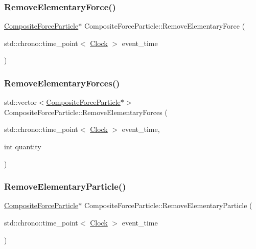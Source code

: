 \subsubsection{\texorpdfstring{Remove\+Elementary\+Force()}{RemoveElementaryForce()}}
{\footnotesize\ttfamily \mbox{\hyperlink{class_composite_force_particle}{Composite\+Force\+Particle}}$\ast$ Composite\+Force\+Particle\+::\+Remove\+Elementary\+Force (\begin{DoxyParamCaption}\item[{std\+::chrono\+::time\+\_\+point$<$ \mbox{\hyperlink{universe_8h_a0ef8d951d1ca5ab3cfaf7ab4c7a6fd80}{Clock}} $>$}]{event\+\_\+time }\end{DoxyParamCaption})}

\mbox{\label{class_composite_force_particle_a1bfa61cec4f5a8436c1a188312ba8f45}} 
\subsubsection{\texorpdfstring{Remove\+Elementary\+Forces()}{RemoveElementaryForces()}}
{\footnotesize\ttfamily std\+::vector$<$\mbox{\hyperlink{class_composite_force_particle}{Composite\+Force\+Particle}}$\ast$$>$ Composite\+Force\+Particle\+::\+Remove\+Elementary\+Forces (\begin{DoxyParamCaption}\item[{std\+::chrono\+::time\+\_\+point$<$ \mbox{\hyperlink{universe_8h_a0ef8d951d1ca5ab3cfaf7ab4c7a6fd80}{Clock}} $>$}]{event\+\_\+time,  }\item[{int}]{quantity }\end{DoxyParamCaption})}

\mbox{\label{class_composite_force_particle_ab63c4a1d5734f1d13806cb9463075a40}} 
\subsubsection{\texorpdfstring{Remove\+Elementary\+Particle()}{RemoveElementaryParticle()}}
{\footnotesize\ttfamily \mbox{\hyperlink{class_composite_force_particle}{Composite\+Force\+Particle}}$\ast$ Composite\+Force\+Particle\+::\+Remove\+Elementary\+Particle (\begin{DoxyParamCaption}\item[{std\+::chrono\+::time\+\_\+point$<$ \mbox{\hyperlink{universe_8h_a0ef8d951d1ca5ab3cfaf7ab4c7a6fd80}{Clock}} $>$}]{event\+\_\+time }\end{DoxyParamCaption})}

